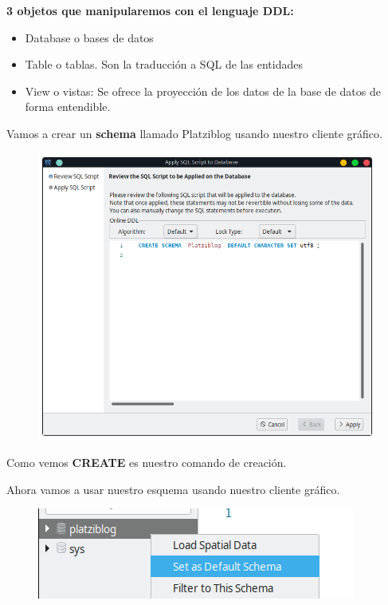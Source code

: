\documentclass{article}
\begin{document}
\textbf{3 objetos que manipularemos con el lenguaje DDL:}
\begin{itemize}
  \item Database o bases de datos
  \item Table o tablas. Son la traducción a SQL de las entidades
  \item View o vistas: Se ofrece la proyección de los datos de la base de datos
    de forma entendible.
\end{itemize}

Vamos a crear un \textbf{schema} llamado Platziblog usando nuestro cliente gráfico.\\
\begin{figure}[h!]
  \centering
  \includegraphics[scale=0.65]{./Pictures/040_create_schema.png}
\end{figure}

Como vemos \textbf{CREATE} es nuestro comando de creación.

\newpage

Ahora vamos a usar nuestro esquema usando nuestro cliente gráfico.\\

\begin{figure}[h!]
  \centering
  \includegraphics[scale=0.65]{./Pictures/043_use_database.png}
\end{figure}
\end{document}
